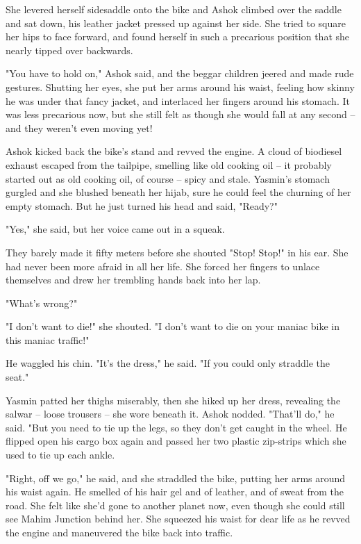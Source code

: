 She levered herself sidesaddle onto the bike and Ashok climbed over
the saddle and sat down, his leather jacket pressed up against her
side. She tried to square her hips to face forward, and found
herself in such a precarious position that she nearly tipped over
backwards.

"You have to hold on," Ashok said, and the beggar children jeered
and made rude gestures. Shutting her eyes, she put her arms around
his waist, feeling how skinny he was under that fancy jacket, and
interlaced her fingers around his stomach. It was less precarious
now, but she still felt as though she would fall at any second --
and they weren't even moving yet!

Ashok kicked back the bike's stand and revved the engine. A cloud
of biodiesel exhaust escaped from the tailpipe, smelling like old
cooking oil -- it probably started out as old cooking oil, of
course -- spicy and stale. Yasmin's stomach gurgled and she blushed
beneath her hijab, sure he could feel the churning of her empty
stomach. But he just turned his head and said, "Ready?"

"Yes," she said, but her voice came out in a squeak.

They barely made it fifty meters before she shouted "Stop! Stop!"
in his ear. She had never been more afraid in all her life. She
forced her fingers to unlace themselves and drew her trembling
hands back into her lap.

"What's wrong?"

"I don't want to die!" she shouted. "I don't want to die on your
maniac bike in this maniac traffic!"

He waggled his chin. "It's the dress," he said. "If you could only
straddle the seat."

Yasmin patted her thighs miserably, then she hiked up her dress,
revealing the salwar -- loose trousers -- she wore beneath it.
Ashok nodded. "That'll do," he said. "But you need to tie up the
legs, so they don't get caught in the wheel. He flipped open his
cargo box again and passed her two plastic zip-strips which she
used to tie up each ankle.

"Right, off we go," he said, and she straddled the bike, putting
her arms around his waist again. He smelled of his hair gel and of
leather, and of sweat from the road. She felt like she'd gone to
another planet now, even though she could still see Mahim Junction
behind her. She squeezed his waist for dear life as he revved the
engine and maneuvered the bike back into traffic.

